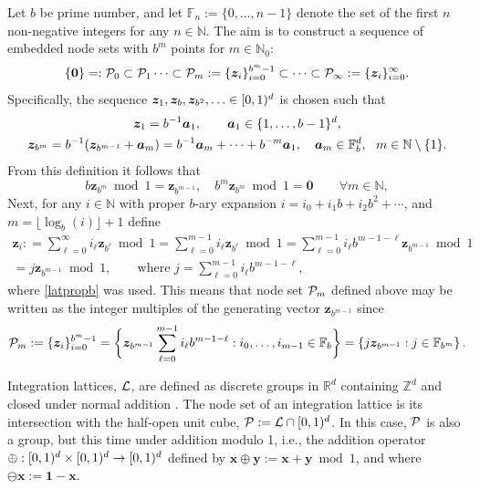 \documentclass[graybox]{svmult}
\newcommand{\Z}{\mathbb{Z}} %
\newcommand{\R}{\mathbb{R}} %
\newcommand{\N}{\mathbb{N}} %
\newcommand{\F}{\mathbb{F}} %
\newcommand{\bszero}{\boldsymbol{0}} %
\newcommand{\bsone}{\boldsymbol{1}}  %
\newcommand{\bsx}{\boldsymbol{x}}    %
\newcommand{\bsy}{\boldsymbol{y}}    %
\newcommand{\bsz}{\boldsymbol{z}}    %
\begin{document}
Let $b$ be prime number, and let $\F_{n}:=\{0, \ldots, n-1\}$ denote the set of the first $n$ non-negative integers for any $n \in \N$. The aim is to construct a sequence of embedded node sets with $b^m$ points for $m \in \N_0$:
\[
\{\bszero\}=:\cp_0\subset \cp_1 \dots\subset\cp_m:=\{\bsz_i\}_{i=0}^{b^m-1} \subset\dots\subset\cp_\infty:=\{\bsz_i\}_{i=0}^{\infty}.
\]
Specifically, the sequence $\bsz_1, \bsz_b, \bsz_{b^2},  \ldots \in \cube$ is chosen such that 
\begin{subequations} \label{zbmdef}
\begin{gather} 
\bsz_1 = b^{-1} \bsa_1, \qquad \bsa_1 \in \{1, \ldots, b-1\}^{d}, \\
\bsz_{b^m} = b^{-1}(\bsz_{b^{m-1}}+\bsa_m)= b^{-1}\bsa_m + \cdots + b^{-m} \bsa_1, \quad \bsa_m \in \F_b^{d}, \ \ m \in \N\setminus\{1\}.
\end{gather}
\end{subequations}
From this definition it follows that
\begin{equation} 
b\bsz_{b^m} \bmod {1} =\bsz_{b^{m-1}}, \quad b^{m}\bsz_{b^{m}} \bmod {1} = \bszero \qquad \forall m \in \N ,\label{latpropb}
\end{equation}
Next, for any $i \in \N$ with proper $b$-ary expansion $i=i_0+i_1 b + i_2 b^2 + \cdots$, and $m=\lfloor \log_b(i) \rfloor+1$ define 
\begin{multline} \label{zidef}
\bsz_i : = \sum_{\ell=0}^{\infty} i_\ell \bsz_{b^\ell} \bmod 1 = \sum_{\ell=0}^{m-1} i_\ell \bsz_{b^\ell} \bmod 1 = \sum_{\ell=0}^{m-1} i_\ell b^{m-1-\ell}  \bsz_{b^{m-1}} \bmod 1 \\ 
 = j \bsz_{b^{m-1}} \bmod 1, \qquad \text{where } j= \sum_{\ell=0}^{m-1} i_\ell b^{m-1-\ell},
\end{multline}
where \eqref{latpropb} was used.  This means that node set $\mathcal{P}_m$ defined above may be written as the integer multiples of the generating vector $\bsz_{b^{m-1}}$ since 
\[
\cp_m:= \{\bsz_i\}_{i=0}^{b^m-1} = \bigg \{ \bsz_{b^{m-1}} \sum_{\ell=0}^{m-1} i_\ell b^{m-1-\ell} : i_0, \ldots , i_{m-1} \in \F_b \bigg \} = \left\{ j \bsz_{b^{m-1}} : j \in \F_{b^m} \right \}.
\]

Integration lattices, $\mathcal{L}$, are defined as discrete groups in $\R^d$ containing $\Z^d$ and closed under normal addition \cite[Sec. 2.7-2.8]{SloJoe94}.  The node set of an integration lattice is its intersection with the half-open unit cube, $\mathcal{P}:=\mathcal{L} \cap [0,1)^d$. In this case, $\mathcal{P}$ is also a group, but this time under addition modulo 1, i.e., the addition operator $\oplus:[0,1)^d \times [0,1)^d \to [0,1)^d$ defined by $\bsx\oplus\bsy:=\bsx+\bsy\bmod 1$, and where $\ominus \bsx:=\bsone-\bsx$.
\end{document}
